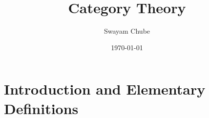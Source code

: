 \documentclass{report}
\title{Category Theory}
\author{Swayam Chube}
\date{\today}
\begin{document}
\maketitle
\tableofcontents

\chapter{Introduction and Elementary Definitions}

\end{document}
